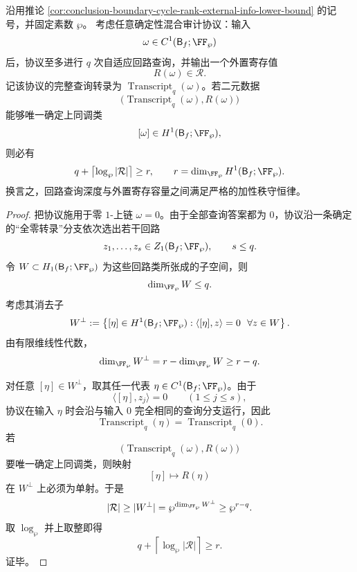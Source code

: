 \begin{theorem}[精确混合审计的秩守恒律]\label{thm:conclusion-boundary-mixed-audit-rank-conservation}
沿用推论 \ref{cor:conclusion-boundary-cycle-rank-external-info-lower-bound} 的记号，并固定素数 \(\wp\)。
考虑任意确定性混合审计协议：输入
\[
\omega\in C^1(\mathsf B_f;\FF_\wp)
\]
后，协议至多进行 \(q\) 次自适应回路查询，并输出一个外置寄存值
\[
R(\omega)\in \mathcal R.
\]
记该协议的完整查询转录为 \(\operatorname{Transcript}_q(\omega)\)。若二元数据
\[
\bigl(\operatorname{Transcript}_q(\omega),R(\omega)\bigr)
\]
能够唯一确定上同调类
\[
[\omega]\in H^1(\mathsf B_f;\FF_\wp),
\]
则必有
\[
q+\left\lceil \log_\wp |\mathcal R| \right\rceil \ge r,
\qquad
r=\dim_{\FF_\wp}H^1(\mathsf B_f;\FF_\wp).
\]
换言之，回路查询深度与外置寄存容量之间满足严格的加性秩守恒律。
\end{theorem}
\begin{proof}
把协议施用于零 \(1\)-上链 \(\omega=0\)。由于全部查询答案都为 \(0\)，协议沿一条确定的“全零转录”分支依次选出若干回路
\[
z_1,\dots,z_s\in Z_1(\mathsf B_f;\FF_\wp),
\qquad
s\le q.
\]
令 \(W\subset H_1(\mathsf B_f;\FF_\wp)\) 为这些回路类所张成的子空间，则
\[
\dim_{\FF_\wp}W\le q.
\]
考虑其消去子
\[
W^\perp
:=
\left\{
[\eta]\in H^1(\mathsf B_f;\FF_\wp):
\langle[\eta],z\rangle=0\ \ \forall z\in W
\right\}.
\]
由有限维线性代数，
\[
\dim_{\FF_\wp}W^\perp=r-\dim_{\FF_\wp}W\ge r-q.
\]

对任意 \([\eta]\in W^\perp\)，取其任一代表 \(\eta\in C^1(\mathsf B_f;\FF_\wp)\)。由于
\[
\langle[\eta],z_j\rangle=0
\qquad(1\le j\le s),
\]
协议在输入 \(\eta\) 时会沿与输入 \(0\) 完全相同的查询分支运行，因此
\[
\operatorname{Transcript}_q(\eta)=\operatorname{Transcript}_q(0).
\]
若
\[
\bigl(\operatorname{Transcript}_q(\omega),R(\omega)\bigr)
\]
要唯一确定上同调类，则映射
\[
[\eta]\longmapsto R(\eta)
\]
在 \(W^\perp\) 上必须为单射。于是
\[
|\mathcal R|\ge |W^\perp|=\wp^{\dim_{\FF_\wp}W^\perp}\ge \wp^{r-q}.
\]
取 \(\log_\wp\) 并上取整即得
\[
q+\left\lceil \log_\wp |\mathcal R| \right\rceil \ge r.
\]
证毕。
\end{proof}

